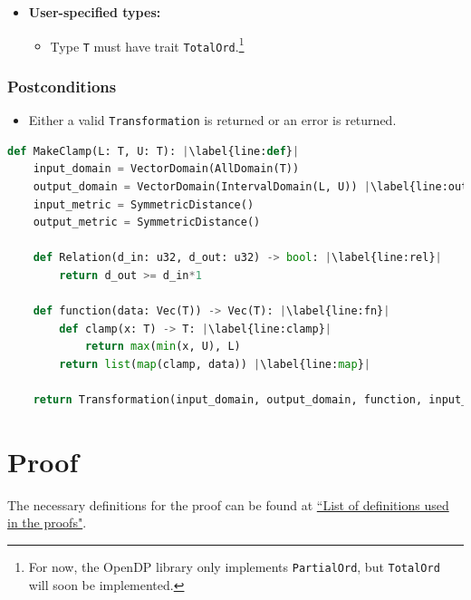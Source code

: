 \documentclass[11pt,a4paper]{article}
\theoremstyle{definition}
\begin{document}
\begin{itemize}
    \item \textbf{User-specified types:}
    \begin{itemize}
        \item Type \texttt{T} must have trait \texttt{TotalOrd}.\footnote{For now, the OpenDP library only implements \texttt{PartialOrd}, but \texttt{TotalOrd} will soon be implemented.}
    \end{itemize}
\end{itemize}

\subsubsection*{Postconditions}
\begin{itemize}
    \item Either a valid \texttt{Transformation} is returned or an error is returned.
\end{itemize}

\begin{lstlisting}[language=Python, escapechar=|] 
def MakeClamp(L: T, U: T): |\label{line:def}|
    input_domain = VectorDomain(AllDomain(T))
    output_domain = VectorDomain(IntervalDomain(L, U)) |\label{line:output}|
    input_metric = SymmetricDistance()
    output_metric = SymmetricDistance()
    
    def Relation(d_in: u32, d_out: u32) -> bool: |\label{line:rel}|
        return d_out >= d_in*1
    
    def function(data: Vec(T)) -> Vec(T): |\label{line:fn}|
        def clamp(x: T) -> T: |\label{line:clamp}|
            return max(min(x, U), L)
        return list(map(clamp, data)) |\label{line:map}|
    
    return Transformation(input_domain, output_domain, function, input_metric, output_metric, stability_relation = Relation)
\end{lstlisting}


\section{Proof}
The necessary definitions for the proof can be found at \href{https://www.overleaf.com/project/60d214e390b337703d200982}{``List of definitions used in the proofs"}.
\end{document}
